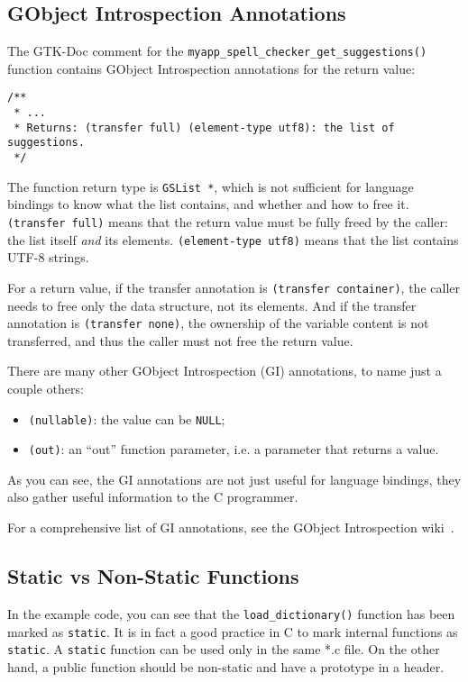 \subsection{GObject Introspection Annotations}
The GTK-Doc comment for the \lstinline{myapp_spell_checker_get_suggestions()} function contains GObject Introspection annotations for the return value:
\begin{lstlisting}
/**
 * ...
 * Returns: (transfer full) (element-type utf8): the list of suggestions.
 */
\end{lstlisting}

The function return type is \lstinline{GSList *}, which is not sufficient for language bindings to know what the list contains, and whether and how to free it. \texttt{(transfer full)} means that the return value must be fully freed by the caller: the list itself \emph{and} its elements. \texttt{(element-type utf8)} means that the list contains UTF-8 strings.

For a return value, if the transfer annotation is \texttt{(transfer container)}, the caller needs to free only the data structure, not its elements. And if the transfer annotation is \texttt{(transfer none)}, the ownership of the variable content is not transferred, and thus the caller must not free the return value.

There are many other GObject Introspection (GI) annotations, to name just a couple others:
\begin{itemize}
  \item \texttt{(nullable)}: the value can be \lstinline{NULL};
  \item \texttt{(out)}: an ``out'' function parameter, i.e. a parameter that returns a value.
\end{itemize}

As you can see, the GI annotations are not just useful for language bindings, they also gather useful information to the C programmer.

For a comprehensive list of GI annotations, see the GObject Introspection wiki~\cite{gobject-introspection}.

\subsection{Static vs Non-Static Functions}
In the example code, you can see that the \lstinline{load_dictionary()} function has been marked as \lstinline{static}. It is in fact a good practice in C to mark internal functions as \lstinline{static}. A \lstinline{static} function can be used only in the same *.c file. On the other hand, a public function should be non-static and have a prototype in a header.

